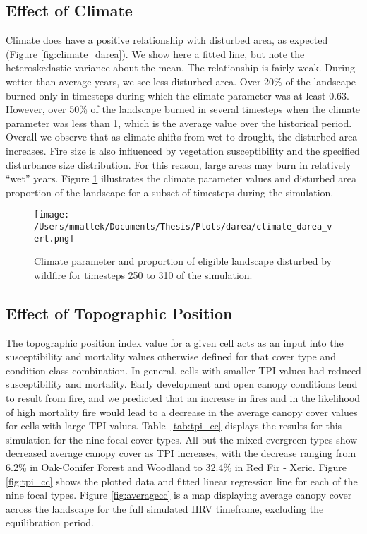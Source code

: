 \subsection{Effect of Climate} 
Climate does have a positive relationship with disturbed area, as expected (Figure \ref{fig:climate_darea}). We show here a fitted line, but note the heteroskedastic variance about the mean. The relationship is fairly weak. During wetter-than-average years, we see less disturbed area. Over 20\% of the landscape burned only in timesteps during which the climate parameter was at least 0.63. However, over 50\% of the landscape burned in several timesteps when the climate parameter was less than 1, which is the average value over the historical period. Overall we observe that as climate shifts from wet to drought, the disturbed area increases. %
Fire size is also influenced by vegetation susceptibility and the specified disturbance size distribution. For this reason, large areas may burn in relatively ``wet'' years. Figure \ref{fig:compare_clim_darea} illustrates the climate parameter values and disturbed area proportion of the landscape for a subset of timesteps during the simulation.

\begin{figure}[!htbp]
\centering
\texttt{[image: /Users/mmallek/Documents/Thesis/Plots/darea/climate\_darea\_vert.png]}
\caption{Climate parameter and proportion of eligible landscape disturbed by wildfire for timesteps 250 to 310 of the simulation.}
\label{fig:compare_clim_darea}
\end{figure}


\subsection{Effect of Topographic Position}

The topographic position index value for a given cell acts as an input into the susceptibility and mortality values otherwise defined for that cover type and condition class combination. In general, cells with smaller TPI values had reduced susceptibility and mortality. Early development and open canopy conditions tend to result from fire, and we predicted that an increase in fires and in the likelihood of high mortality fire would lead to a decrease in the average canopy cover values for cells with large TPI values. Table~\ref{tab:tpi_cc} displays the results for this simulation for the nine focal cover types. All but the mixed evergreen types show decreased average canopy cover as TPI increases, with the decrease ranging from 6.2\% in Oak-Conifer Forest and Woodland to 32.4\% in Red Fir - Xeric. Figure \ref{fig:tpi_cc} shows the plotted data and fitted linear regression line for each of the nine focal types. Figure \ref{fig:averagecc} is a map displaying average canopy cover across the landscape for the full simulated HRV timeframe, excluding the equilibration period. 

